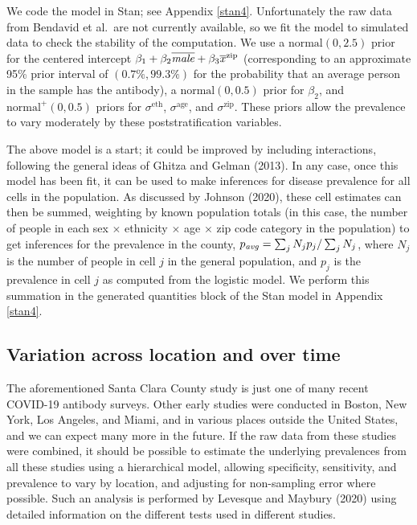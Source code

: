 \documentclass[11pt]{article}
\begin{document}
We code the model in Stan; see Appendix \ref{stan4}.  Unfortunately the raw data from Bendavid et al.\  are not currently available, so we fit the model to simulated data to check the stability of the computation.  We use a $\mbox{normal}(0,2.5)$ prior for the centered intercept  $\beta_1 + \beta_2\overline{\it male} + \beta_3\overline{x}^{\rm zip}$ (corresponding to an approximate 95\% prior interval of $(0.7\%, 99.3\%)$ for the probability that an average person in the sample has the antibody), a $\mbox{normal}(0,0.5)$ prior for $\beta_2$, and $\mbox{normal}^+(0, 0.5)$ priors for $\sigma^{\textrm{eth}}$, $\sigma^{\textrm{age}}$, and $\sigma^{\textrm{zip}}$.  These priors allow the prevalence to vary moderately by these poststratification variables.

The above model is a start; it could be improved by including interactions, following the general ideas of Ghitza and Gelman (2013).  In any case, once this model has been fit, it can be used to make inferences for disease prevalence for all cells in the population. As discussed by Johnson (2020), these cell estimates can then be summed, weighting by known population totals (in this case, the number of people in each sex $\times$ ethnicity $\times$ age $\times$ zip code category in the population) to get inferences for the prevalence in the county, $p_{\it avg} = \sum_jN_jp_j/\sum_jN_j$, where $N_j$ is the number of people in cell $j$ in the general population, and $p_j$ is the prevalence in cell $j$ as computed from the logistic model.  We perform this summation in the generated quantities block of the Stan model in Appendix \ref{stan4}.

\subsection{Variation across location and over time}\label{muiltiple}
The aforementioned Santa Clara County study is just one of many recent COVID-19 antibody surveys.  Other early studies were conducted in Boston, New York, Los Angeles, and Miami, and in various places outside the United States, and we can expect many more in the future.  If the raw data from these studies were combined, it should be possible to estimate the underlying prevalences from all these studies using a hierarchical model, allowing specificity, sensitivity, and prevalence to vary by location, and adjusting for non-sampling error where possible.  Such an analysis is performed by Levesque and Maybury (2020) using detailed information on the different tests used in different studies.
\end{document}
